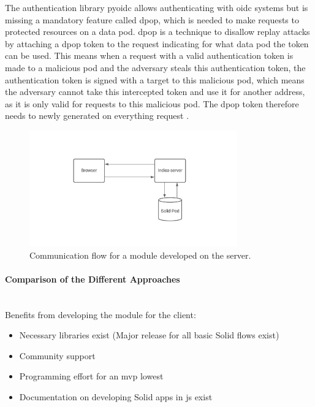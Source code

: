 The authentication library pyoidc allows authenticating with \gls{oidc} systems but is missing a mandatory feature called \gls{dpop}, which is needed to make requests to protected resources on a data pod. \gls{dpop} is a technique to disallow replay attacks by attaching a \gls{dpop} token to the request indicating for what data pod the token can be used. This means when a request with a valid authentication token is made to a malicious pod and the adversary steals this authentication token, the authentication token is signed with a target to this malicious pod, which means the adversary cannot take this intercepted token and use it for another address, as it is only valid for requests to this malicious pod. The \gls{dpop} token therefore needs to newly generated on everything request \cite{dpop-spec}.

\begin{figure}
    \centering
    \includegraphics[width=0.8\textwidth]{prototype/graphs/poc-infrastructure-backend.jpeg}
    \caption{Communication flow for a module developed on the server.}
    \label{fig:poc-infrastructure-backend}
\end{figure}
\vspace{0.5cm}
\paragraph{Comparison of the Different Approaches}\mbox{}\\

Benefits from developing the module for the client:

\begin{itemize}
    \item Necessary libraries exist (Major release for all basic Solid flows exist)
    \item Community support
    \item Programming effort for an \gls{mvp} lowest
    \item Documentation on developing Solid apps in \gls{js} exist
\end{itemize}

